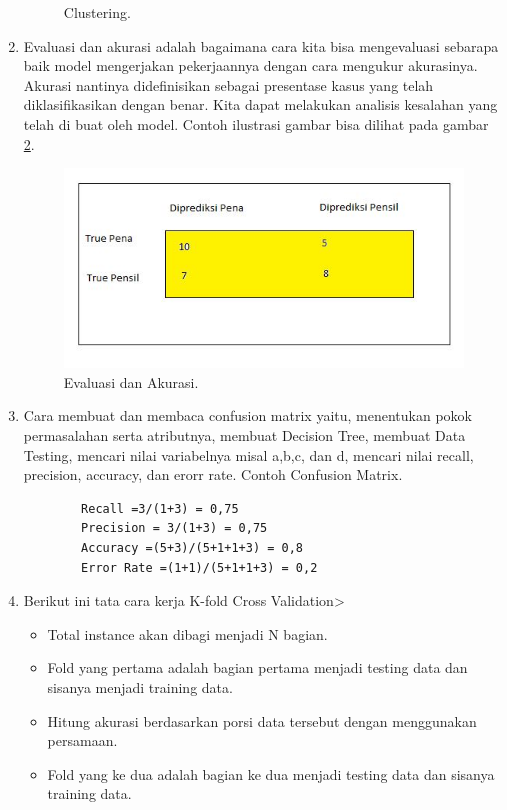 \begin{enumerate}
\begin{figure}[!htbp]
		\caption{Clustering.}
		\label{4}
\end{figure}
\item Evaluasi dan akurasi adalah bagaimana cara kita bisa mengevaluasi sebarapa baik model mengerjakan pekerjaannya dengan cara mengukur akurasinya. Akurasi nantinya didefinisikan sebagai presentase kasus yang telah diklasifikasikan dengan benar. Kita dapat melakukan analisis kesalahan yang telah di buat oleh model.
\subitem Contoh ilustrasi gambar bisa dilihat pada gambar \ref{5}.
\begin{figure}[!htbp]
		\centerline{\includegraphics[width=1\textwidth]{figures/huda/evaluasidanakurasi.JPG}}
		\caption{Evaluasi dan Akurasi.}
		\label{5}
\end{figure}
\item Cara membuat dan membaca confusion matrix yaitu, menentukan pokok permasalahan serta atributnya, membuat Decision Tree, membuat Data Testing, mencari nilai variabelnya misal a,b,c, dan d, mencari nilai recall, precision, accuracy, dan erorr rate.
\subitem Contoh Confusion Matrix.
\begin{verbatim}
		Recall =3/(1+3) = 0,75
		Precision = 3/(1+3) = 0,75
		Accuracy =(5+3)/(5+1+1+3) = 0,8
		Error Rate =(1+1)/(5+1+1+3) = 0,2 
\end{verbatim}
\item Berikut ini tata cara kerja K-fold Cross Validation>
	\begin{itemize}
		\item Total instance akan dibagi menjadi N bagian.
		\item Fold yang pertama adalah bagian pertama menjadi testing data dan sisanya menjadi training data.
		\item Hitung akurasi berdasarkan porsi data tersebut dengan menggunakan persamaan.
		\item Fold yang ke dua adalah bagian ke dua menjadi testing data dan sisanya training data. 

\end{itemize}
\end{enumerate}
